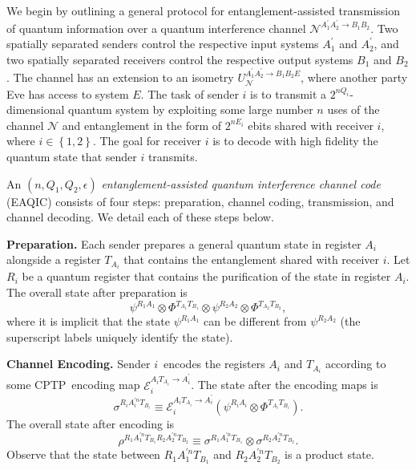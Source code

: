 \documentclass[aps,11pt,twoside,letterpaper]{article}
\begin{document}
		    

		

		We begin by outlining a general protocol for entanglement-assisted
		transmission of quantum information over a quantum interference channel
		$\mathcal{N}^{A_{1}^{\prime}A_{2}^{\prime}\rightarrow B_{1}B_{2}}$. Two
		spatially separated senders control the respective input systems
		$A_{1}^{\prime}$ and $A_{2}^{\prime}$, and two spatially separated receivers
		control the respective output systems $B_{1}$ and $B_{2}$. The channel has an
		extension to an isometry $U_{\mathcal{N}}^{A_{1}^{\prime}A_{2}^{\prime
		}\rightarrow B_{1}B_{2}E}$, where another party Eve has access to system $E$.
		The task of sender $i$ is to transmit a $2^{nQ_{i}}$-dimensional quantum
		system by exploiting some large number $n$ uses of the channel $\mathcal{N}$
		and entanglement in the form of $2^{nE_{i}}$ ebits shared with receiver $i$,
		where $i\in\left\{  1,2\right\}  $. The goal for receiver $i$ is to decode
		with high fidelity the quantum state that sender $i$ transmits.

		An $(n,Q_{1},Q_{2},\epsilon)$ \textit{entanglement-assisted quantum
		interference channel code} (EAQIC) consists of four steps: preparation,
		channel coding, transmission, and channel decoding. We detail each of these
		steps below.

		\textbf{Preparation.} Each sender prepares a general quantum state in register
		$A_{i}$ alongside a register $T_{A_{i}}$ that contains the entanglement shared
		with receiver $i$. Let $R_{i}$ be a quantum register that contains the
		purification of the state in register $A_{i}$. The overall state after
		preparation is%
		\[
		\psi^{R_{1}A_{1}}\otimes\Phi^{T_{A_{1}}T_{B_{1}}}\otimes\psi^{R_{2}A_{2}%
		}\otimes\Phi^{T_{A_{2}}T_{B_{2}}},
		\]
		where it is implicit that the state $\psi^{R_{1}A_{1}}$ can be different from
		$\psi^{R_{2}A_{2}}$ (the superscript labels uniquely identify the state).

		\textbf{Channel Encoding.} Sender $i$\ encodes the registers $A_{i}$ and
		$T_{A_{i}}$ according to some CPTP\ encoding map $\mathcal{E}_{i}%
		^{A_{i}T_{A_{i}}\rightarrow A_{i}^{\prime}}$. The state after the encoding
		maps is%
		\[
		\sigma^{R_{i}A_{i}^{\prime n}T_{B_{i}}}\equiv\mathcal{E}_{i}^{A_{i}T_{A_{i}%
		}\rightarrow A_{i}^{\prime}}(\psi^{R_{i}A_{i}}\otimes\Phi^{T_{A_{i}}T_{B_{i}}%
		}).
		\]
		The overall state after encoding is%
		\[
		\rho^{R_{1}A_{1}^{\prime n}T_{B_{1}}R_{2}A_{2}^{\prime n}T_{B_{2}}}%
		\equiv\sigma^{R_{1}A_{1}^{\prime n}T_{B_{1}}}\otimes\sigma^{R_{2}A_{2}^{\prime
		n}T_{B_{2}}}.
		\]
		Observe that the state between $R_{1}A_{1}^{\prime n}T_{B_{1}}$ and
		$R_{2}A_{2}^{\prime n}T_{B_{2}}$ is a product state.
\end{document}

